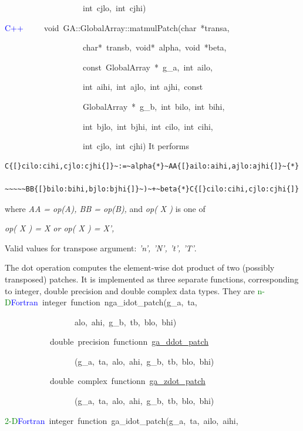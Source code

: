 ~~~~~~~~~~~~~~~~~~~int~cjlo,~int~cjhi)~

\textcolor{blue}{C++}~~~~~void~GA::GlobalArray::matmulPatch(char~{*}transa,

~~~~~~~~~~~~~~~~~~~char{*}~transb,~void{*}~alpha,~void~{*}beta,~

~~~~~~~~~~~~~~~~~~~const~GlobalArray~{*}~g\_a,~int~ailo,~

~~~~~~~~~~~~~~~~~~~int~aihi,~int~ajlo,~int~ajhi,~const~

~~~~~~~~~~~~~~~~~~~GlobalArray~{*}~g\_b,~int~bilo,~int~bihi,~

~~~~~~~~~~~~~~~~~~~int~bjlo,~int~bjhi,~int~cilo,~int~cihi,~

~~~~~~~~~~~~~~~~~~~int~cjlo,~int~cjhi)
It performs
\begin{verbatim}
C{[}cilo:cihi,cjlo:cjhi{]}~:=~alpha{*}~AA{[}ailo:aihi,ajlo:ajhi{]}~{*}

~~~~~BB{[}bilo:bihi,bjlo:bjhi{]}~)~+~beta{*}C{[}cilo:cihi,cjlo:cjhi{]}
\end{verbatim}
where \emph{AA = op(A), BB = op(B),} and \emph{op( X )} is one of

\emph{op( X ) = X or op( X ) = X',}

Valid values for transpose argument:\emph{ 'n', 'N', 't', 'T'}.

The dot operation computes the element-wise dot product of two (possibly
transposed) patches. It is implemented as three separate functions,
corresponding to integer, double precision and double complex data
types. They are
\textcolor{green}{n-D}\textcolor{blue}{Fortran}~integer~function~nga\_idot\_patch(g\_a,~ta,~

~~~~~~~~~~~~~~~~~alo,~ahi,~g\_b,~tb,~blo,~bhi)~

~~~~~~~~~~~double~precision~functionn~\href{http://www.emsl.pnl.gov/docs/global/ga_ops.html\#ga_ddot_patch}{ga\_{}ddot\_{}patch}

~~~~~~~~~~~~~~~~~(g\_a,~ta,~alo,~ahi,~g\_b,~tb,~blo,~bhi)~

~~~~~~~~~~~double~complex~functionn~\href{http://www.emsl.pnl.gov/docs/global/ga_ops.html\#ga_zdot_patch}{ga\_{}zdot\_{}patch}

~~~~~~~~~~~~~~~~~(g\_a,~ta,~alo,~ahi,~g\_b,~tb,~blo,~bhi)



\textcolor{green}{2-D}\textcolor{blue}{Fortran}~integer~function~ga\_idot\_patch(g\_a,~ta,~ailo,~aihi,

